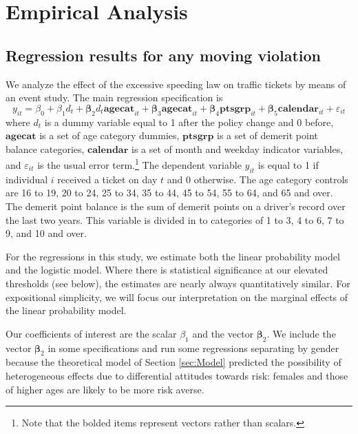 \section{Empirical Analysis}
\label{sec:Empirical}


\subsection{Regression results for any moving violation}
\label{sec:Empirical_all}


We analyze the effect of the excessive speeding law on traffic tickets 
by means of an event study. 
The main regression specification is
%
$$
y_{it} = \beta_0 + \beta_1 d_t
      + \bm{\beta}_2 d_t \bm{agecat}_{it} + \bm{\beta}_3 \mathbf{agecat}_{it}
      + \bm{\beta}_4 \bm{ptsgrp}_{it}
      + \bm{\beta}_5 \bm{calendar}_{it}
      + \varepsilon_{it}
$$
%
where $d_t$ is a dummy variable equal to 1 after the policy change and 0 before, 
$\mathbf{agecat}$ is a set of age category dummies, 
$\mathbf{ptsgrp}$ is a set of demerit point balance categories, 
$\mathbf{calendar}$ is a set of month and weekday indicator variables, 
and $\varepsilon_{it}$ is the usual error term.\footnote{%
Note that the bolded items represent vectors rather than scalars.}
%  
The dependent variable $y_{it}$ is equal to 1 if individual $i$ received a ticket on day $t$ and 0 otherwise. 
The age category controls are 16 to 19, 20 to 24, 25 to 34, 35 to 44, 45 to 54, 55 to 64, and 65 and over. 
The demerit point balance is the sum of demerit points on a driver’s record over the last two years. 
This variable is divided in to categories of 1 to 3, 4 to 6, 7 to 9, and 10 and over.

For the regressions in this study, we estimate both the linear probability model and the logistic model. 
Where there is statistical significance at our elevated thresholds (see below), 
the estimates are nearly always quantitatively similar. 
For expositional simplicity, we will focus our interpretation on 
the marginal effects of the linear probability model.

Our coefficients of interest are the scalar $\beta_1$ and the vector $\bm{\beta}_2$. 
We include the vector $\bm{\beta}_2$ in some specifications 
and run some regressions separating by gender because the theoretical model of 
Section \ref{sec:Model} 
predicted the possibility of heterogeneous effects due to differential attitudes towards risk: 
females and those of higher ages are likely to be more risk averse. %

